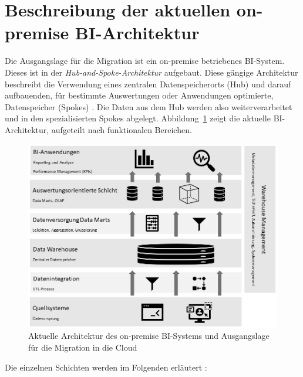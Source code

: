 \section{Beschreibung der aktuellen on-premise BI-Architektur}
\label{sec:grundlagen:onpremiseBI}
Die Ausgangslage für die Migration ist ein on-premise betriebenes BI-System. Dieses ist in der \textit{Hub-and-Spoke-Architektur} aufgebaut. Diese gängige Architektur beschreibt die Verwendung eines zentralen Datenspeicherorts (Hub) und darauf aufbauenden, für bestimmte Auswertungen oder Anwendungen optimierte, Datenspeicher (Spokes) \cite{kemper_bi-glossar_2008}. Die Daten aus dem Hub werden also weiterverarbeitet und in den spezialisierten Spokes abgelegt. Abbildung~\ref{fig:aktuelle_onpremise_bi_architektur} zeigt die aktuelle BI-Architektur, aufgeteilt nach funktionalen Bereichen.
\begin{figure}[htbp]
 \centering
 \includegraphics[width=\textwidth]{gfx/aktuelle_onpremise_bi_architektur.png}
 \caption{Aktuelle Architektur des on-premise BI-Systems und Ausgangslage für die Migration in die Cloud \cite{grunwald_business_2009}\cite{humm_architektur_2005}}
\label{fig:aktuelle_onpremise_bi_architektur}
\end{figure}
Die einzelnen Schichten werden im Folgenden erläutert \cite{grunwald_business_2009}\cite{kemper_bi-glossar_2008}\cite{humm_architektur_2005}:
